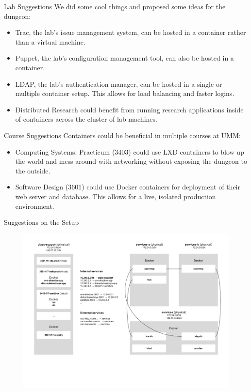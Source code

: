 \documentclass[xcolor=dvipsnames,aspectratio=1610]{beamer}
\begin{document}
  \begin{frame}{Lab Suggestions}
      We did some cool things and proposed some ideas for the dungeon:
      \begin{itemize}
          \item \alert{Trac}, the lab's issue management system, can be hosted in a container rather than a virtual machine.
          \item \alert{Puppet}, the lab's configuration management tool, can also be hosted in a container.
          \item \alert{LDAP}, the lab's authentication manager, can be hosted in a single or multiple container setup. This allows for load balancing and faster logins.
          \item \alert{Distributed Research} could benefit from running research applications inside of containers across the cluster of lab machines.
      \end{itemize}
  \end{frame}

  \begin{frame}{Course Suggestions}
      Containers could be beneficial in multiple courses at UMM:
      \begin{itemize}
          \item \alert{Computing Systems: Practicum} (3403) could use LXD containers to blow up the world and mess around with networking without exposing the dungeon to the outside.
          \item \alert{Software Design} (3601) could use Docker containers for deployment of their web server and database. This allows for a live, isolated production environment.
      \end{itemize}
  \end{frame}

  \begin{frame}{Suggestions on the Setup}
      \begin{figure}
        \includegraphics[scale=0.41]{proposal.png}
      \end{figure}
  \end{frame}
\end{document}
